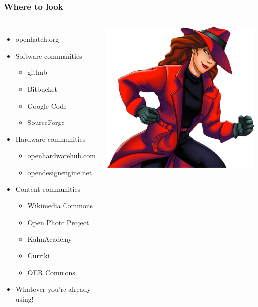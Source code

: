 \documentclass{beamer}
\begin{document}
\begin{frame}
  \frametitle{Where to look}
  \begin{columns}[c]
    \begin{itemize}
    \item openhatch.org
    \item Software communities 
      \begin{itemize}
      \item github
      \item Bitbucket
      \item Google Code
      \item SourceForge
      \end{itemize}
    \item Hardware communities
      \begin{itemize}
      \item openhardwarehub.com
      \item opendesignengine.net
      \end{itemize}
    \item Content communities
      \begin{itemize}
      \item Wikimedia Commons
      \item Open Photo Project
      \item KahnAcademy
      \item Curriki
      \item OER Commons
      \end{itemize}
    \item Whatever you're already using!
    \end{itemize}
    \includegraphics[width=1\textwidth]{../img/carmen-sandiego}
  \end{columns}
\end{frame}
\end{document}
